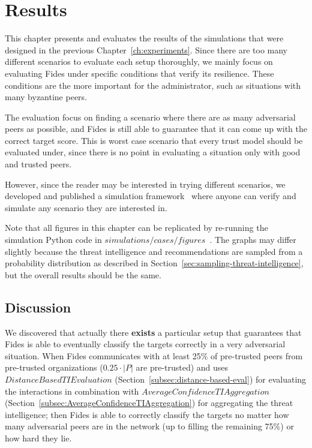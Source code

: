 \chapter{Results}
\label{ch:results}
This chapter presents and evaluates the results of the simulations that were designed in the previous Chapter~\ref{ch:experiments}. Since there are too many different scenarios to evaluate each setup thoroughly, we mainly focus on evaluating Fides under specific conditions that verify its resilience. These conditions are the more important for the administrator, such as situations with many byzantine peers.

The evaluation focus on finding a scenario where there are as many adversarial peers as possible, and Fides is still able to guarantee that it can come up with the correct target score. This is worst case scenario that every trust model should be evaluated under, since there is no point in evaluating a situation only with good and trusted peers.

However, since the reader may be interested in trying different scenarios, we developed and published a simulation framework~\cite{fidesGithub} where anyone can verify and simulate any scenario they are interested in.

Note that all figures in this chapter can be replicated by re-running the simulation Python code in $simulations/cases/figures$~\cite{fidesGithub}.
The graphs may differ slightly because the threat intelligence and recommendations are sampled from a probability distribution as described in Section~\ref{sec:sampling-threat-intelligence}, but the overall results should be the same.








\section{Discussion}
\label{sec:discussion}
We discovered that actually there \textbf{exists} a particular setup that guarantees that Fides is able to eventually classify the targets correctly in a very adversarial situation. When Fides communicates with at least 25\% of pre-trusted peers from pre-trusted organizations ($0.25 \cdot |P|$ are pre-trusted) and uses $DistanceBasedTIEvaluation$ (Section~\ref{subsec:distance-based-eval}) for evaluating the interactions in combination with $AverageConfidenceTIAggregation$ (Section~\ref{subsec:AverageConfidenceTIAggregation}) for aggregating the threat intelligence; then Fides is able to correctly classify the targets no matter how many adversarial peers are in the network (up to filling the remaining 75\%) or how hard they lie.

